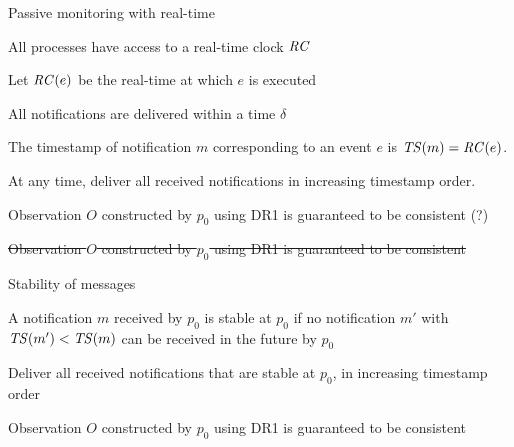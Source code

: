 \begin{frame}{Passive monitoring with real-time}

\BI
\item All processes have access to a real-time clock $\mathit{RC}$
\item Let $\mathit{RC}(e)$ be the real-time at which $e$ is executed
\item All notifications are delivered within a time $\delta$
\item The timestamp of notification $m$ corresponding to an event $e$
  is $\mathit{TS}(m) = \mathit{RC}(e)$.
\EI
\begin{definition}
At any time, deliver all received notifications
in increasing timestamp order.
\end{definition}
\begin{overprint}
\begin{theorem}
\noindent
Observation $O$ constructed by $p_0$ using DR1 is guaranteed to be
consistent (?)
\end{theorem}
\begin{theorem}
\sout{\noindent
Observation $O$ constructed by $p_0$ using DR1 is guaranteed to be
consistent
}
\end{theorem}
\end{overprint}


\end{frame}

\begin{frame}{Stability of messages}

\begin{definition}[Stability] A notification  $m$ received by $p_0$ is \alert{stable at $p_0$} if no notification
$m'$ with $\mathit{TS}(m') < \mathit{TS}(m)$ can be received in the future by $p_0$
\end{definition}


\begin{definition}
Deliver all received notifications that are stable at $p_0$, in increasing timestamp order
\end{definition}
\smallskip
\begin{theorem}
Observation $O$ constructed by $p_0$ using DR1 is guaranteed to be
consistent
\end{theorem}


\end{frame}


